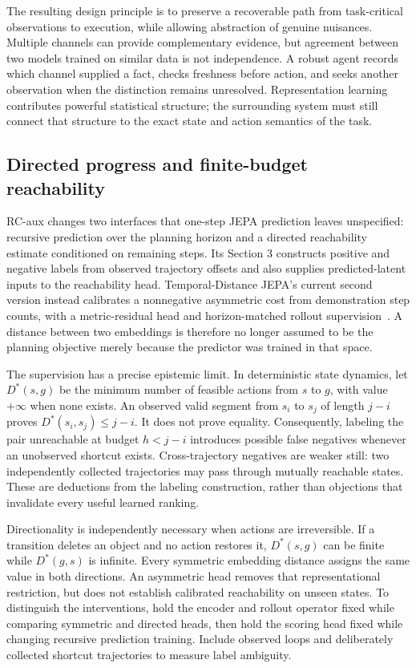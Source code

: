 The resulting design principle is to preserve a recoverable path from task-critical observations to execution, while allowing abstraction of genuine nuisances. Multiple channels can provide complementary evidence, but agreement between two models trained on similar data is not independence. A robust agent records which channel supplied a fact, checks freshness before action, and seeks another observation when the distinction remains unresolved. Representation learning contributes powerful statistical structure; the surrounding system must still connect that structure to the exact state and action semantics of the task.

\subsection{Directed progress and finite-budget reachability}
\label{sec:C05:plangeometry}
RC-aux changes two interfaces that one-step JEPA prediction leaves unspecified: recursive prediction over the planning horizon and a directed reachability estimate conditioned on remaining steps. Its Section 3 constructs positive and negative labels from observed trajectory offsets and also supplies predicted-latent inputs to the reachability head. Temporal-Distance JEPA's current second version instead calibrates a nonnegative asymmetric cost from demonstration step counts, with a metric-residual head and horizon-matched rollout supervision~\cite{rewrite_rcaux2026,rewrite_tdjepa2026}. A distance between two embeddings is therefore no longer assumed to be the planning objective merely because the predictor was trained in that space.

The supervision has a precise epistemic limit. In deterministic state dynamics, let $D^*(s,g)$ be the minimum number of feasible actions from $s$ to $g$, with value $+\infty$ when none exists. An observed valid segment from $s_i$ to $s_j$ of length $j-i$ proves $D^*(s_i,s_j)\leq j-i$. It does not prove equality. Consequently, labeling the pair unreachable at budget $h<j-i$ introduces possible false negatives whenever an unobserved shortcut exists. Cross-trajectory negatives are weaker still: two independently collected trajectories may pass through mutually reachable states. These are deductions from the labeling construction, rather than objections that invalidate every useful learned ranking.

Directionality is independently necessary when actions are irreversible. If a transition deletes an object and no action restores it, $D^*(s,g)$ can be finite while $D^*(g,s)$ is infinite. Every symmetric embedding distance assigns the same value in both directions. An asymmetric head removes that representational restriction, but does not establish calibrated reachability on unseen states. To distinguish the interventions, hold the encoder and rollout operator fixed while comparing symmetric and directed heads, then hold the scoring head fixed while changing recursive prediction training. Include observed loops and deliberately collected shortcut trajectories to measure label ambiguity.

